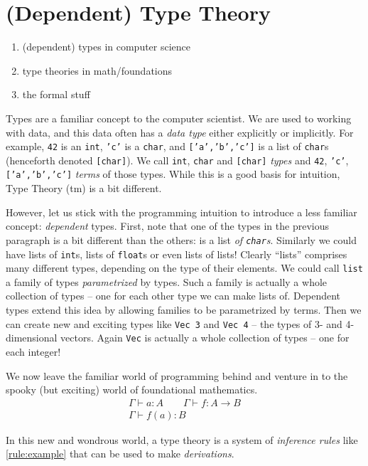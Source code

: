 \section{(Dependent) Type Theory}
\begin{enumerate}
  \item (dependent) types in computer science
  \item type theories in math/foundations
  \item the formal stuff
\end{enumerate}

Types are a familiar concept to the computer scientist. We are used to working
with data, and this data often has a \emph{data type} either explicitly or
implicitly. For example, \texttt{42} is an \texttt{int}, \texttt{'c'} is a
\texttt{char}, and \texttt{['a','b','c']} is a list of \texttt{char}s (henceforth
denoted \texttt{[char]}). We call
\texttt{int}, \texttt{char} and \texttt{[char]} \emph{types} and
\texttt{42}, \texttt{'c'}, \texttt{['a','b','c']} \emph{terms} of those types.
While this is a good basis for intuition, Type Theory (tm) is a bit different.

However, let us stick with the programming intuition to introduce a less
familiar concept: \emph{dependent} types. First, note that one of the types in
the previous paragraph is a bit different than the others: \text{['a','b','c']} is a
list \emph{of \texttt{char}s}. Similarly we could have lists of \texttt{int}s,
lists of \texttt{float}s or even lists of lists! Clearly ``lists'' comprises
many different types, depending on the type of their elements. We could call
\texttt{list} a family of types \emph{parametrized} by types. Such a family is
actually a whole collection of types -- one for each other type we can make
lists of.
Dependent types extend this idea by allowing families to be parametrized by
terms. Then we can create new and exciting types like \texttt{Vec 3} and
\texttt{Vec 4} -- the types of 3- and 4-dimensional vectors. Again \texttt{Vec} is
actually a whole collection of types -- one for each integer!

We now leave the familiar world of programming behind and venture in to the spooky
(but exciting) world of foundational mathematics.
\begin{equation}
  \begin{array}{c}
    \Gamma \vdash a : A \qquad \Gamma \vdash f : A \rightarrow B\\
    \hline
    \Gamma \vdash f(a) : B
  \end{array}
  \label{rule:example}
  \end{equation}

In this new and wondrous world, a type theory is a system of \emph{inference
  rules} like \ref{rule:example} that can be used to make \emph{derivations}.